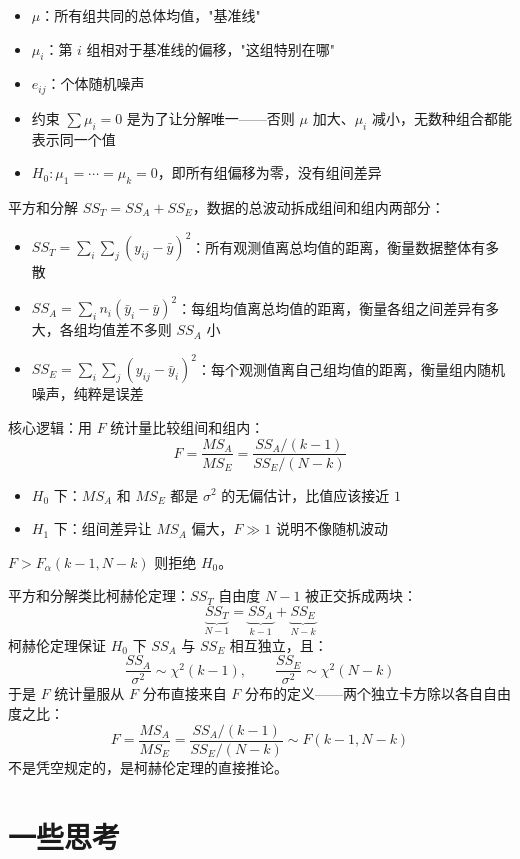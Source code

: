 \begin{itemize}
  \item $\mu$：所有组共同的总体均值，"基准线"
  \item $\mu_i$：第 $i$ 组相对于基准线的偏移，"这组特别在哪"
  \item $e_{ij}$：个体随机噪声
  \item 约束 $\sum \mu_i = 0$ 是为了让分解唯一——否则 $\mu$ 加大、$\mu_i$ 减小，无数种组合都能表示同一个值
  \item $H_0: \mu_1 = \cdots = \mu_k = 0$，即所有组偏移为零，没有组间差异
\end{itemize}
\begin{note}
平方和分解 $SS_T = SS_A + SS_E$，数据的总波动拆成组间和组内两部分：
\begin{itemize}
  \item $SS_T = \sum_i\sum_j (y_{ij} - \bar{y})^2$：所有观测值离总均值的距离，衡量数据整体有多散
  \item $SS_A = \sum_i n_i(\bar{y}_i - \bar{y})^2$：每组均值离总均值的距离，衡量各组之间差异有多大，各组均值差不多则 $SS_A$ 小
  \item $SS_E = \sum_i\sum_j (y_{ij} - \bar{y}_i)^2$：每个观测值离自己组均值的距离，衡量组内随机噪声，纯粹是误差
\end{itemize}

核心逻辑：用 $F$ 统计量比较组间和组内：
\[
F = \frac{MS_A}{MS_E} = \frac{SS_A/(k-1)}{SS_E/(N-k)}
\]
\begin{itemize}
  \item $H_0$ 下：$MS_A$ 和 $MS_E$ 都是 $\sigma^2$ 的无偏估计，比值应该接近 $1$
  \item $H_1$ 下：组间差异让 $MS_A$ 偏大，$F \gg 1$ 说明不像随机波动
\end{itemize}
$F > F_\alpha(k-1, N-k)$ 则拒绝 $H_0$。
\end{note}
\begin{dxtips}
平方和分解类比柯赫伦定理：$SS_T$ 自由度 $N-1$ 被正交拆成两块：
\[
\underbrace{SS_T}_{N-1} = \underbrace{SS_A}_{k-1} + \underbrace{SS_E}_{N-k}
\]
柯赫伦定理保证 $H_0$ 下 $SS_A$ 与 $SS_E$ 相互独立，且：
\[
\frac{SS_A}{\sigma^2} \sim \chi^2(k-1), \qquad \frac{SS_E}{\sigma^2} \sim \chi^2(N-k)
\]
于是 $F$ 统计量服从 $F$ 分布直接来自 $F$ 分布的定义——两个独立卡方除以各自自由度之比：
\[
F = \frac{MS_A}{MS_E} = \frac{SS_A/(k-1)}{SS_E/(N-k)} \sim F(k-1, N-k)
\]
不是凭空规定的，是柯赫伦定理的直接推论。
\end{dxtips}
\chapter{一些思考}
